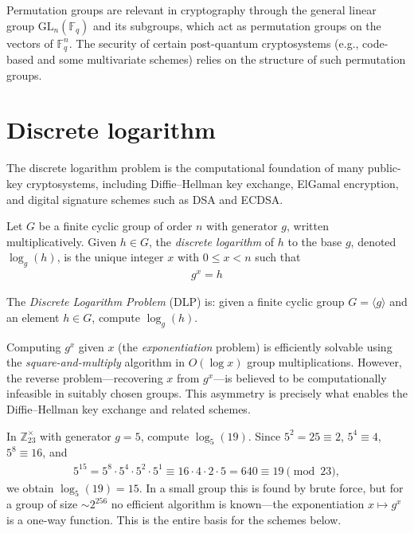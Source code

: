 \documentclass[a4paper, 12pt]{book} %
\begin{document}
\begin{remark}
    Permutation groups are relevant in cryptography through the general linear group $\mathrm{GL}_n(\mathbb{F}_q)$ and its subgroups, which act as permutation groups on the vectors of $\mathbb{F}_q^n$. The security of certain post-quantum cryptosystems (e.g., code-based and some multivariate schemes) relies on the structure of such permutation groups.
\end{remark}

\section{Discrete logarithm}

The discrete logarithm problem is the computational foundation of many
public-key cryptosystems, including Diffie--Hellman key exchange, ElGamal
encryption, and digital signature schemes such as DSA and ECDSA.

\begin{definition}
    Let $G$ be a finite cyclic group of order $n$ with generator $g$, written multiplicatively. Given $h \in G$, the \emph{discrete logarithm} of $h$ to the base $g$, denoted $\log_g(h)$, is the unique integer $x$ with $0 \leq x < n$ such that
    \begin{align}
        g^x = h
    \end{align}
\end{definition}

\begin{definition}
    The \emph{Discrete Logarithm Problem} (DLP) is: given a finite cyclic group $G = \langle g \rangle$ and an element $h \in G$, compute $\log_g(h)$.
\end{definition}

\begin{remark}
    Computing $g^x$ given $x$ (the \emph{exponentiation} problem) is efficiently solvable using the \emph{square-and-multiply} algorithm in $O(\log x)$ group multiplications. However, the reverse problem---recovering $x$ from $g^x$---is believed to be computationally infeasible in suitably chosen groups. This asymmetry is precisely what enables the Diffie--Hellman key exchange and related schemes.
\end{remark}

\begin{example}
    In $\mathbb{Z}_{23}^\times$ with generator $g = 5$, compute $\log_5(19)$. Since $5^2 = 25 \equiv 2$, $5^4 \equiv 4$, $5^8 \equiv 16$, and
    \begin{align}
        5^{15} = 5^{8}\cdot 5^{4}\cdot 5^{2}\cdot 5^{1} \equiv 16 \cdot 4 \cdot 2 \cdot 5 = 640 \equiv 19 \pmod{23},
    \end{align}
    we obtain $\log_5(19) = 15$. In a small group this is found by brute force, but for a group of size $\sim 2^{256}$ no efficient algorithm is known---the exponentiation $x \mapsto g^x$ is a one-way function. This is the entire basis for the schemes below.
\end{example}
\end{document}
